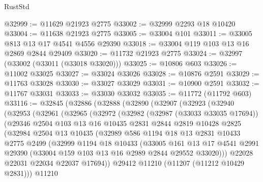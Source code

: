 \begin{lexlean}{RustStd}
\begin{coremodule}
@32999 := @11629 @21923 @2775
@33002 := @32999 @2293 @18 @10420
@33004 := @11638 @21923 @2775
@33005 := @33004 @101
@33011 := @33005 @813 @13 @17 @4541 @4556 @29390
@33018 := @33004 @119 @103 @13 @16 @2869 @2844 @29409
@33020 := @11732 @21923 @2775
@33024 := @32997 (@33002 (@33011 (@33018 @33020)))
@33025 := @10806 @603
@33026 := @11002 @33025
@33027 := @33024 @33026
@33028 := @10876 @2591
@33029 := @11763 @33028
@33030 := @33027 @33029
@33031 := @10900 @2591
@33032 := @11767 @33031
@33033 := @33030 @33032
@33035 := @11772 (@11792 @603)
@33116 := @32845
    (@32886
      (@32888
        (@32890
          (@32907
            (@32923
              (@32940
                (@32953
                  (@32961
                    (@32965
                      (@32972
                        (@32982
                          (@32987 (@33033 @33035 @17694))
                          (@29346
                            @2504
                            @103
                            @13
                            @16
                            @10435
                            @2831
                            @2844
                            @2819
                            @10428
                            @2825
                            (@32984
                              @2504
                              @13
                              @10435
                              (@32989
                                @586
                                @1194
                                @18
                                @13
                                @2831
                                @10433
                                @2775
                                @2499
                                (@32999
                                  @1194
                                  @18
                                  @10433
                                  (@33005
                                    @161
                                    @13
                                    @17
                                    @4541
                                    @2991
                                    @29390
                                    (@33004 @159 @103 @13 @16 @2989 @2844 @29552 @33020)))
                                @22028
                                @22031
                                @22034
                                @22037
                                @17694))
                            @29412
                            @11210
                            (@11207 (@11212 @10429 @2831)))
                          @11210

\end{coremodule}
\end{lexlean}
